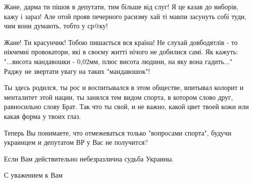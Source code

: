 \begin{itemize}
 

Жане, дарма ти пішов в депутати, тим більше від слуг! Я це казав до виборів,
кажу і зараз! Але отой прояв печерного расизму хай ті мавпи засунуть собі туди,
чим вони думають, тобто у ср@ку!

 

Жане! Ти красунчик! Тобою пишається вся країна! Не слухай довбодятлів - то
нікчемні провокатори, які в своєму житті нічого не добилися самі. Як кажуть:
"...висота мандавошки - 0,02мм, плюс висота людини, на яку вона гадить..."
Раджу не звертати увагу на таких "мандавошок"!


 

Ты здесь родился, ты рос и воспитывался в этом обществе, впитывал колорит и
менталитет этой нации, ты занялся тем видом спорта, в котором слово
друг, равносильно слову Брат. Так что ты свой, и не важно, какой цвет твоей кожи
или какая форма у твоих глаз.


 

Теперь Вы понимаете, что отмежеваться только "вопросами спорта", будучи
украинцем и депутатом ВР у Вас не получится?

Если Вам действительно небезразлична судьба Украины.

С уважением к Вам


 


\end{itemize}
